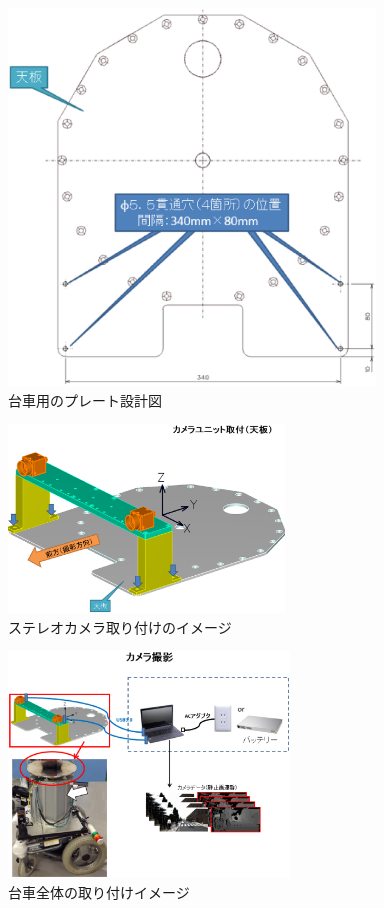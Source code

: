 \begin{figure}[h]
  \begin{center}
   \includegraphics[height=100mm]{figure/台車用のプレート設計図.eps}
   \caption{台車用のプレート設計図}
   \label{台車用のプレート設計図}
  \end{center}
\end{figure}
\newpage
%
\begin{figure}[htbp]
  \begin{center}
   \includegraphics[height=50mm]{figure/ステレオカメラ取り付けのイメージ.eps}
   \caption{ステレオカメラ取り付けのイメージ}
   \label{ステレオカメラ取り付けのイメージ}
  \end{center}
\end{figure}

\begin{figure}[htbp]
  \begin{center}
   \includegraphics[height=60mm]{figure/台車全体の取り付けイメージ.eps}
   \caption{台車全体の取り付けイメージ}
   \label{台車全体の取り付けイメージ}
  \end{center}
\end{figure}

